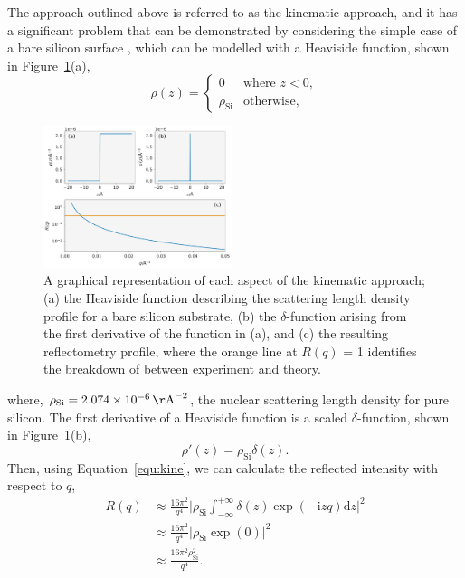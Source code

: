 \documentclass[
 reprint,
 superscriptaddress,
 amsmath,amssymb,
 aps,
]{revtex4-1}
\newcommand{\angstrom}{\rm{\AA}}
\begin{document}
The approach outlined above is referred to as the kinematic approach, and it has a significant problem that can be demonstrated by considering the simple case of a bare silicon surface \cite{sivia_elementary_2011}, which can be modelled with a Heaviside function, shown in Figure~\ref{fig:kine}(a),
%
\begin{equation}
    \rho(z) = 
    \begin{cases}
        0 & \text{where } z < 0,\\
        \rho_{\text{Si}} & \text{otherwise},
    \end{cases}
\end{equation}
%
%
\begin{figure}[t]
    \includegraphics[width=0.49\textwidth]{kine}
    \caption{A graphical representation of each aspect of the kinematic approach; (a) the Heaviside function describing the scattering length density profile for a bare silicon substrate, (b) the $\delta$-function arising from the first derivative of the function in (a), and (c) the resulting reflectometry profile, where the orange line at $R(q)$ = 1 identifies the breakdown of between experiment and theory.}
    \label{fig:kine}
\end{figure}
%
where, $\rho_{\text{Si}} = \SI{2.074e-6}{\angstrom^{-2}}$, the nuclear scattering length density for pure silicon. 
The first derivative of a Heaviside function is a scaled $\delta$-function, shown in Figure~\ref{fig:kine}(b), 
%
\begin{equation}
    \rho'(z) = \rho_{\text{Si}}\delta(z).
\end{equation}
%
Then, using Equation~\ref{equ:kine}, we can calculate the reflected intensity with respect to $q$, 
%
\begin{equation}
    \begin{aligned}
    R(q) & \approx \frac{16\pi^2}{q^4} \bigg| \rho_{\text{Si}}\int^{+\infty}_{-\infty}{\delta(z)\exp{(-\mathrm{i} zq) \text{d}z}} \bigg|^2 \\ 
     & \approx \frac{16\pi^2}{q^4} \bigg| \rho_{\text{Si}} \exp{(0)} \bigg| ^2 \\
     & \approx \frac{16\pi^2\rho_{\text{Si}}^2}{q^4}.
    \end{aligned}
    \label{equ:baresi}
\end{equation}
\end{document}
